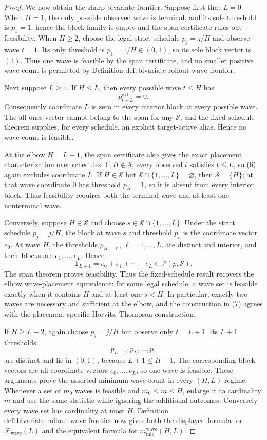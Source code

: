\documentclass{article}
\begin{document}
\begin{proof}
We now obtain the sharp bivariate frontier.  Suppose first that \(L=0\).  When \(H=1\), the only possible observed wave is terminal, and its sole threshold is \(p_1=1\); hence the block family is empty and the span certificate rules out feasibility.  When \(H\ge2\), choose the legal strict schedule \(p_j=j/H\) and observe wave \(t=1\).  Its only threshold is \(p_1=1/H\in(0,1)\), so its sole block vector is \((1)\).  Thus one wave is feasible by the span certificate, and no smaller positive wave count is permitted by Definition \(\mathrm{def:bivariate\text{-}rollout\text{-}wave\text{-}frontier}\).

Next suppose \(L\ge1\).  If \(H\le L\), then every possible wave \(t\le H\) has
\[
 p^{\mathrm{ext}}_{t-L}=0.
\tag{6}
\]
Consequently coordinate \(L\) is zero in every interior block at every possible wave.  The all-ones vector cannot belong to the span for any \(\mathcal S\), and the fixed-schedule theorem supplies, for every schedule, an explicit target-active alias.  Hence no wave count is feasible.

At the elbow \(H=L+1\), the span certificate also gives the exact placement characterization over schedules.  If \(H\notin\mathcal S\), every observed \(t\) satisfies \(t\le L\), so (6) again excludes coordinate \(L\).  If \(H\in\mathcal S\) but \(\mathcal S\cap\{1,\ldots,L\}=\varnothing\), then \(\mathcal S=\{H\}\); at that wave coordinate \(0\) has threshold \(p_H=1\), so it is absent from every interior block.  Thus feasibility requires both the terminal wave and at least one nonterminal wave.

Conversely, suppose \(H\in\mathcal S\) and choose \(s\in\mathcal S\cap\{1,\ldots,L\}\).  Under the strict schedule \(p_j=j/H\), the block at wave \(s\) and threshold \(p_s\) is the coordinate vector \(e_0\).  At wave \(H\), the thresholds \(p_{H-\ell}\), \(\ell=1,\ldots,L\), are distinct and interior, and their blocks are \(e_1,\ldots,e_L\).  Hence
\[
 \mathbf 1_{L+1}=e_0+e_1+\cdots+e_L
 \in\mathcal V(p,\mathcal S).
\tag{7}
\]
The span theorem proves feasibility.  Thus the fixed-schedule result recovers the elbow wave-placement equivalence: for some legal schedule, a wave set is feasible exactly when it contains \(H\) and at least one \(s<H\).  In particular, exactly two waves are necessary and sufficient at the elbow, and the construction in (7) agrees with the placement-specific Horvitz--Thompson construction.

If \(H\ge L+2\), again choose \(p_j=j/H\) but observe only \(t=L+1\).  Its \(L+1\) thresholds
\[
 p_{L+1},p_L,\ldots,p_1
\]
are distinct and lie in \((0,1)\), because \(L+1\le H-1\).  The corresponding block vectors are all coordinate vectors \(e_0,\ldots,e_L\), so one wave is feasible.  These arguments prove the asserted minimum wave count in every \((H,L)\) regime.  Whenever a set of \(m_0\) waves is feasible and \(m_0\le m\le H\), enlarge it to cardinality \(m\) and use the same statistic while ignoring the additional outcomes.  Conversely every wave set has cardinality at most \(H\).  Definition \(\mathrm{def:bivariate\text{-}rollout\text{-}wave\text{-}frontier}\) now gives both the displayed formula for \(\mathcal F_{\mathrm{wave}}(L)\) and the equivalent formula for \(m_{\min}^{\mathrm{wave}}(H,L)\).


\end{proof}
\end{document}
